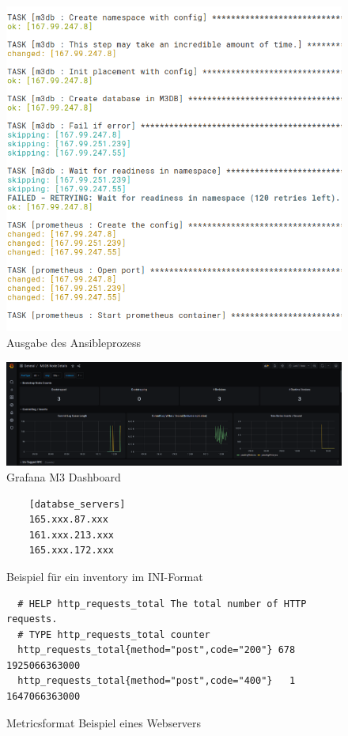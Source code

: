 \documentclass[11pt,a4paper]{article}
\begin{document}
\begin{figure}[!htbp]
  \centering
  \includegraphics[width=12cm]{assets/ansible_run_m3db.png}
  \caption{Ausgabe des Ansibleprozess}
  \label{figure:ansible-run}
\end{figure}

\begin{figure}[!htbp]
  \centering
  \includegraphics[width=16cm]{assets/m3db_grafana_dashboard.png}
  \caption{Grafana M3 Dashboard}
  \label{figure:m3-dash}
\end{figure}

\newpage

\begin{figure}[!htbp]
  \begin{lstlisting}
    [databse_servers]
    165.xxx.87.xxx
    161.xxx.213.xxx
    165.xxx.172.xxx
    \end{lstlisting}
  \caption{Beispiel für ein \gls{inventory} im \gls{INI}-Format}
  \label{figure:ansible-inv}
\end{figure}

\begin{figure}[!htbp]
  \begin{lstlisting}
  # HELP http_requests_total The total number of HTTP requests.
  # TYPE http_requests_total counter
  http_requests_total{method="post",code="200"} 678 1925066363000
  http_requests_total{method="post",code="400"}   1 1647066363000
  \end{lstlisting}
  \caption{Metricsformat Beispiel eines Webservers}
  \label{figure:metrics}
\end{figure}
\end{document}
